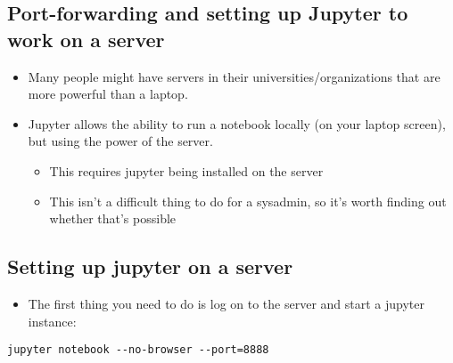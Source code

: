 \documentclass[10pt,parskip=half,
	toc=sectionentrywithdots,
	bibliography=totocnumbered,
	captions=tableheading,numbers=noendperiod]{scrartcl}
\providecommand{\tightlist}{%
  \setlength{\itemsep}{0pt}\setlength{\parskip}{0pt}}
\begin{document}
\hypertarget{port-forwarding-and-setting-up-jupyter-to-work-on-a-server}{%
\subsection{Port-forwarding and setting up Jupyter to work on a
server}\label{port-forwarding-and-setting-up-jupyter-to-work-on-a-server}}

\begin{itemize}
\tightlist
\item
  Many people might have servers in their universities/organizations
  that are more powerful than a laptop.
\item
  Jupyter allows the ability to run a notebook locally (on your laptop
  screen), but using the power of the server.

  \begin{itemize}
  \tightlist
  \item
    This requires jupyter being installed on the server
  \item
    This isn't a difficult thing to do for a sysadmin, so it's worth
    finding out whether that's possible
  \end{itemize}
\end{itemize}

\hypertarget{setting-up-jupyter-on-a-server}{%
\subsection{Setting up jupyter on a
server}\label{setting-up-jupyter-on-a-server}}

\begin{itemize}
\tightlist
\item
  The first thing you need to do is log on to the server and start a
  jupyter instance:
\end{itemize}

\texttt{jupyter\ notebook\ -\/-no-browser\ -\/-port=8888}
\end{document}
